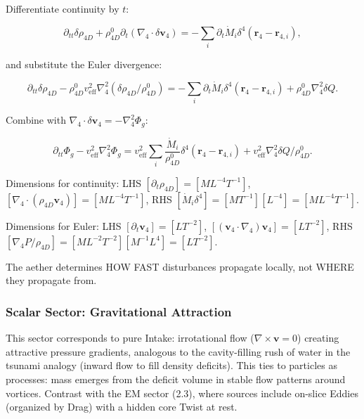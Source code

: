 Differentiate continuity by $t$:

\begin{equation}
\partial_{tt} \delta \rho_{4D} + \rho_{4D}^0 \partial_t (\nabla_4 \cdot \delta \mathbf{v}_4) = -\sum_i \partial_t \dot{M}_i \delta^4(\mathbf{r}_4 - \mathbf{r}_{4,i}),
\end{equation}

and substitute the Euler divergence:

\begin{equation}
\partial_{tt} \delta \rho_{4D} - \rho_{4D}^0 v_{\text{eff}}^2 \nabla_4^2 (\delta \rho_{4D} / \rho_{4D}^0) = -\sum_i \partial_t \dot{M}_i \delta^4(\mathbf{r}_4 - \mathbf{r}_{4,i}) + \rho_{4D}^0 \nabla_4^2 \delta Q.
\end{equation}

Combine with $\nabla_4 \cdot \delta \mathbf{v}_4 = -\nabla_4^2 \Phi_g$:

\begin{equation}
\partial_{tt} \Phi_g - v_{\text{eff}}^2 \nabla_4^2 \Phi_g = v_{\text{eff}}^2 \sum_i \frac{\dot{M}_i}{\rho_{4D}^0} \delta^4(\mathbf{r}_4 - \mathbf{r}_{4,i}) + v_{\text{eff}}^2 \nabla_4^2 \delta Q / \rho_{4D}^0.
\end{equation}

\begin{tcolorbox}[title=Dimensional Checks]
Dimensions for continuity: LHS $[\partial_t \rho_{4D}] = [M L^{-4} T^{-1}]$, $[\nabla_4 \cdot (\rho_{4D} \mathbf{v}_4)] = [M L^{-4} T^{-1}]$, RHS $[\dot{M}_i \delta^4] = [M T^{-1}] [L^{-4}] = [M L^{-4} T^{-1}]$.

Dimensions for Euler: LHS $[\partial_t \mathbf{v}_4] = [L T^{-2}]$, $[(\mathbf{v}_4 \cdot \nabla_4) \mathbf{v}_4] = [L T^{-2}]$, RHS $[\nabla_4 P / \rho_{4D}] = [M L^{-2} T^{-2}] [M^{-1} L^{4}] = [L T^{-2}]$.
\end{tcolorbox}

\begin{tcolorbox}
The aether determines HOW FAST disturbances propagate locally, not WHERE they propagate from.
\end{tcolorbox}

\subsubsection{Scalar Sector: Gravitational Attraction}

This sector corresponds to pure Intake: irrotational flow ($\nabla \times \mathbf{v} = 0$) creating attractive pressure gradients, analogous to the cavity-filling rush of water in the tsunami analogy (inward flow to fill density deficits). This ties to particles as processes: mass emerges from the deficit volume in stable flow patterns around vortices. Contrast with the EM sector (2.3), where sources include on-slice Eddies (organized by Drag) with a hidden core Twist at rest.



